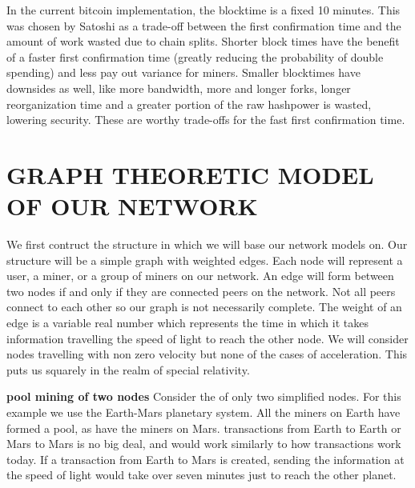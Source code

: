 \documentclass[conference]{IEEEtran}
\begin{document}
In the current bitcoin implementation, the blocktime is a fixed 10 minutes. This was chosen by Satoshi as a trade-off between the first confirmation time and the amount of work wasted due to chain splits. Shorter block times have the benefit of a faster first confirmation time (greatly reducing the probability of double spending) and less pay out variance for miners. Smaller blocktimes have downsides as well, like more bandwidth, more and longer forks, longer reorganization time and a greater portion of the raw hashpower is wasted, lowering security. These are worthy trade-offs for the fast first confirmation time. 

\section{GRAPH THEORETIC MODEL OF OUR NETWORK}
We first contruct the structure in which we will base our network models on. Our structure will be a simple graph with weighted edges. Each node will represent a user, a miner, or a group of miners on our network. An edge will form between two nodes if and only if they are connected peers on the network. Not all peers connect to each other so our graph is not necessarily complete. The weight of an edge is a variable real number which represents the time in which it takes information travelling the speed of light to reach the other node. We will consider nodes travelling with non zero velocity but none of the cases of acceleration. This puts us squarely in the realm of special relativity. 
 
\textbf{pool mining of two nodes} Consider the of only two simplified nodes. For this example we use the Earth-Mars planetary system. All the miners on Earth have formed a pool, as have the miners on Mars. transactions from Earth to Earth or Mars to Mars is no big deal, and would work similarly to how transactions work today. If a transaction from Earth to Mars is created, sending the information at the speed of light would take over seven minutes just to reach the other planet. 
\end{document}
